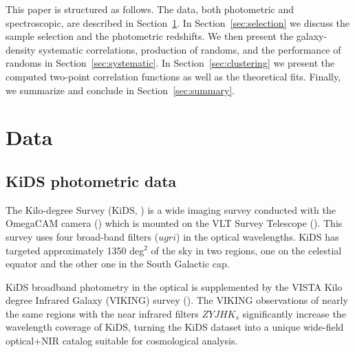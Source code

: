 \documentclass[fleqn,usenatbib,useAMS]{mnras}
\begin{document}
This paper is structured as follows. The data, both photometric and spectroscopic, are described in Section~\ref{sec:data}. In Section~\ref{sec:selection} we discuss the sample selection and the photometric redshifts. We then present the galaxy-density systematic correlations, production of randoms, and the performance of randoms in Section~\ref{sec:systematic}. In Section~\ref{sec:clustering} we present the computed two-point correlation functions as well as the theoretical fits.
Finally, we summarize and conclude in Section~\ref{sec:summary}. 


\section{Data}\label{sec:data}

\subsection{KiDS photometric data}\label{sec:kids}
The Kilo-degree Survey (KiDS, \citealt{kids}) is a wide 
imaging survey conducted with the OmegaCAM camera (\citealt{omegacam}) which is mounted on the VLT Survey Telescope (\citealt{vst}). This survey uses four broad-band filters ($ugri$) in the optical wavelengths. KiDS has targeted approximately 1350 deg$^2$ of the sky in two regions, one on the celestial equator and the other one in the South Galactic cap. 

KiDS broadband photometry in the optical is supplemented by the VISTA Kilo degree Infrared Galaxy (VIKING) survey (\citealt{irwin2004,lewis2010,Edge2013,Gonz2018}). The VIKING observations of nearly the same regions with the near infrared filters $ZYJHK_{s}$ significantly increase the wavelength coverage of KiDS, turning the KiDS dataset into a unique wide-field optical+NIR catalog suitable for cosmological analysis.
\end{document}
